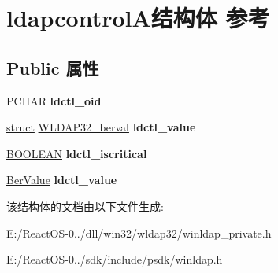 \hypertarget{structldapcontrol_a}{}\section{ldapcontrol\+A结构体 参考}
\label{structldapcontrol_a}
\subsection*{Public 属性}
\begin{DoxyCompactItemize}
\item 
\mbox{\label{structldapcontrol_a_ae4d8399ba4a7e9298f37913edb3ca852}} 
P\+C\+H\+AR {\bfseries ldctl\+\_\+oid}
\item 
\mbox{\label{structldapcontrol_a_a15d0563b86c4c30f44e485983a8dabfb}} 
\hyperlink{interfacestruct}{struct} \hyperlink{struct_w_l_d_a_p32__berval}{W\+L\+D\+A\+P32\+\_\+berval} {\bfseries ldctl\+\_\+value}
\item 
\mbox{\label{structldapcontrol_a_ac41caa642ca050e9ddcbbb1700191b2e}} 
\hyperlink{_processor_bind_8h_a112e3146cb38b6ee95e64d85842e380a}{B\+O\+O\+L\+E\+AN} {\bfseries ldctl\+\_\+iscritical}
\item 
\mbox{\label{structldapcontrol_a_a8c7bdda71f43cf57a9f9704e6c9d6c7d}} 
\hyperlink{structberval}{Ber\+Value} {\bfseries ldctl\+\_\+value}
\end{DoxyCompactItemize}


该结构体的文档由以下文件生成\+:\begin{DoxyCompactItemize}
\item 
E\+:/\+React\+O\+S-\/0../dll/win32/wldap32/winldap\+\_\+private.\+h\item 
E\+:/\+React\+O\+S-\/0../sdk/include/psdk/winldap.\+h\end{DoxyCompactItemize}
